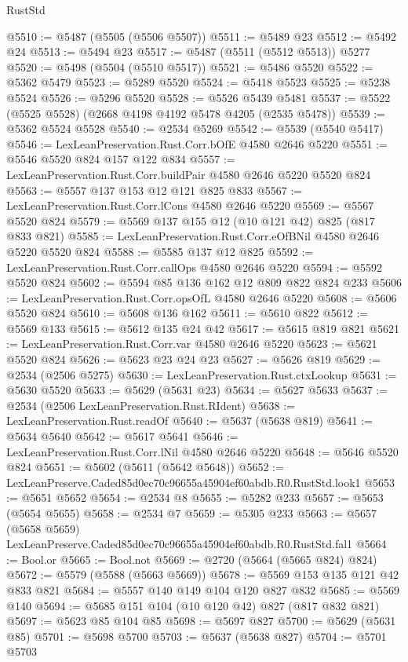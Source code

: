 \begin{lexlean}{RustStd}
\begin{coremodule}
@5510 := @5487 (@5505 (@5506 @5507))
@5511 := @5489 @23
@5512 := @5492 @24
@5513 := @5494 @23
@5517 := @5487 (@5511 (@5512 @5513)) @5277
@5520 := @5498 (@5504 (@5510 @5517))
@5521 := @5486 @5520
@5522 := @5362 @5479
@5523 := @5289 @5520
@5524 := @5418 @5523
@5525 := @5238 @5524
@5526 := @5296 @5520
@5528 := @5526 @5439 @5481
@5537 := @5522 (@5525 @5528) (@2668 @4198 @4192 @5478 @4205 (@2535 @5478))
@5539 := @5362 @5524 @5528
@5540 := @2534 @5269
@5542 := @5539 (@5540 @5417)
@5546 := LexLeanPreservation.Rust.Corr.bOfE @4580 @2646 @5220
@5551 := @5546 @5520 @824 @157 @122 @834
@5557 := LexLeanPreservation.Rust.Corr.buildPair @4580 @2646 @5220 @5520 @824
@5563 := @5557 @137 @153 @12 @121 @825 @833
@5567 := LexLeanPreservation.Rust.Corr.lCons @4580 @2646 @5220
@5569 := @5567 @5520 @824
@5579 := @5569 @137 @155 @12 (@10 @121 @42) @825 (@817 @833 @821)
@5585 := LexLeanPreservation.Rust.Corr.eOfBNil @4580 @2646 @5220 @5520 @824
@5588 := @5585 @137 @12 @825
@5592 := LexLeanPreservation.Rust.Corr.callOps @4580 @2646 @5220
@5594 := @5592 @5520 @824
@5602 := @5594 @85 @136 @162 @12 @809 @822 @824 @233
@5606 := LexLeanPreservation.Rust.Corr.opsOfL @4580 @2646 @5220
@5608 := @5606 @5520 @824
@5610 := @5608 @136 @162
@5611 := @5610 @822
@5612 := @5569 @133
@5615 := @5612 @135 @24 @42
@5617 := @5615 @819 @821
@5621 := LexLeanPreservation.Rust.Corr.var @4580 @2646 @5220
@5623 := @5621 @5520 @824
@5626 := @5623 @23 @24 @23
@5627 := @5626 @819
@5629 := @2534 (@2506 @5275)
@5630 := LexLeanPreservation.Rust.ctxLookup
@5631 := @5630 @5520
@5633 := @5629 (@5631 @23)
@5634 := @5627 @5633
@5637 := @2534 (@2506 LexLeanPreservation.Rust.RIdent)
@5638 := LexLeanPreservation.Rust.readOf
@5640 := @5637 (@5638 @819)
@5641 := @5634 @5640
@5642 := @5617 @5641
@5646 := LexLeanPreservation.Rust.Corr.lNil @4580 @2646 @5220
@5648 := @5646 @5520 @824
@5651 := @5602 (@5611 (@5642 @5648))
@5652 := LexLeanPreserve.Caded85d0ec70c96655a45904ef60abdb.R0.RustStd.look1
@5653 := @5651 @5652
@5654 := @2534 @8
@5655 := @5282 @233
@5657 := @5653 (@5654 @5655)
@5658 := @2534 @7
@5659 := @5305 @233
@5663 := @5657 (@5658 @5659) LexLeanPreserve.Caded85d0ec70c96655a45904ef60abdb.R0.RustStd.fal1
@5664 := Bool.or
@5665 := Bool.not
@5669 := @2720 (@5664 (@5665 @824) @824)
@5672 := @5579 (@5588 (@5663 @5669))
@5678 := @5569 @153 @135 @121 @42 @833 @821
@5684 := @5557 @140 @149 @104 @120 @827 @832
@5685 := @5569 @140
@5694 := @5685 @151 @104 (@10 @120 @42) @827 (@817 @832 @821)
@5697 := @5623 @85 @104 @85
@5698 := @5697 @827
@5700 := @5629 (@5631 @85)
@5701 := @5698 @5700
@5703 := @5637 (@5638 @827)
@5704 := @5701 @5703

\end{coremodule}
\end{lexlean}
